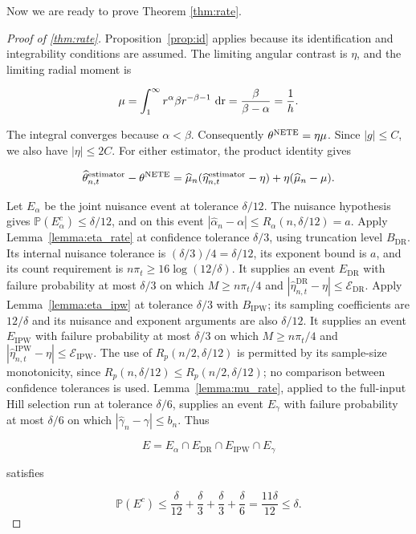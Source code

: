 \documentclass[12pt]{article}
\theoremstyle{plain}
\theoremstyle{definition}
\begin{document}
Now we are ready to prove Theorem \ref{thm:rate}.
\begin{proof}[Proof of \cref{thm:rate}]
Proposition~\ref{prop:id} applies because its identification and integrability conditions are assumed. The limiting angular contrast is $\eta$, and the limiting radial moment is

\[
\mu=\int_1^\infty r^\alpha\beta r^{-\beta-1}\,\operatorname{dr}=\frac{\beta}{\beta-\alpha}=\frac1h.
\]

The integral converges because $\alpha<\beta$. Consequently $\theta^{\operatorname{NETE}}=\eta\mu$. Since $|g|\leq C$, we also have $|\eta|\leq2C$. For either estimator, the product identity gives

\[
\widehat\theta_{n,t}^{\mathrm{estimator}}-\theta^{\operatorname{NETE}}
=\widehat\mu_n(\widehat\eta_{n,t}^{\mathrm{estimator}}-\eta)+\eta(\widehat\mu_n-\mu).
\]
 

Let $E_\alpha$ be the joint nuisance event at tolerance $\delta/12$. The nuisance hypothesis gives $\mathbb P(E_\alpha^c)\leq\delta/12$, and on this event $|\hat\alpha_n-\alpha|\leq R_\alpha(n,\delta/12)=a$. Apply Lemma~\ref{lemma:eta_rate} at confidence tolerance $\delta/3$, using truncation level $B_{\mathrm{DR}}$. Its internal nuisance tolerance is $(\delta/3)/4=\delta/12$, its exponent bound is $a$, and its count requirement is $n\pi_t\geq16\log(12/\delta)$. It supplies an event $E_{\mathrm{DR}}$ with failure probability at most $\delta/3$ on which $M\geq n\pi_t/4$ and $|\hat\eta_{n,t}^{\mathrm{DR}}-\eta|\leq\mathcal E_{\mathrm{DR}}$. Apply Lemma~\ref{lemma:eta_ipw} at tolerance $\delta/3$ with $B_{\mathrm{IPW}}$; its sampling coefficients are $12/\delta$ and its nuisance and exponent arguments are also $\delta/12$. It supplies an event $E_{\mathrm{IPW}}$ with failure probability at most $\delta/3$ on which $M\geq n\pi_t/4$ and $|\hat\eta_{n,t}^{\mathrm{IPW}}-\eta|\leq\mathcal E_{\mathrm{IPW}}$. The use of $R_p(n/2,\delta/12)$ is permitted by its sample-size monotonicity, since $R_p(n,\delta/12)\leq R_p(n/2,\delta/12)$; no comparison between confidence tolerances is used. Lemma~\ref{lemma:mu_rate}, applied to the full-input Hill selection run at tolerance $\delta/6$, supplies an event $E_\gamma$ with failure probability at most $\delta/6$ on which $|\hat\gamma_n-\gamma|\leq b_n$. Thus

\[
E=E_\alpha\cap E_{\mathrm{DR}}\cap E_{\mathrm{IPW}}\cap E_\gamma
\]

satisfies

\[
\mathbb P(E^c)\leq\frac{\delta}{12}+\frac{\delta}{3}+\frac{\delta}{3}+\frac{\delta}{6}=\frac{11\delta}{12}\leq\delta.
\]


\end{proof}
\end{document}
